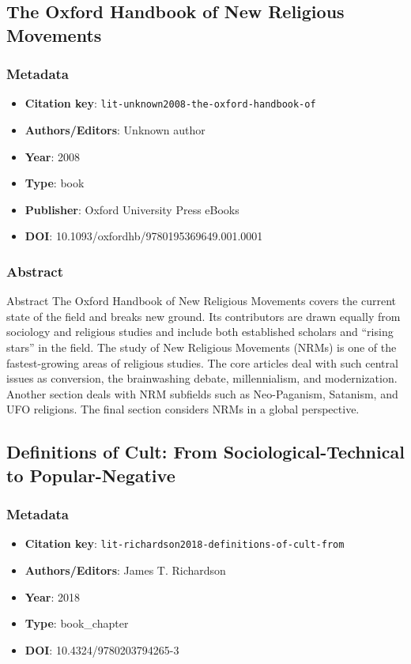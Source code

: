 \subsection{The Oxford Handbook of New Religious Movements}\label{lit:lit-unknown2008-the-oxford-handbook-of}
\subsubsection*{Metadata}
\begin{itemize}
  \item \textbf{Citation key}: \texttt{lit-unknown2008-the-oxford-handbook-of}
  \item \textbf{Authors/Editors}: Unknown author
  \item \textbf{Year}: 2008
  \item \textbf{Type}: book
  \item \textbf{Publisher}: Oxford University Press eBooks
  \item \textbf{DOI}: 10.1093/oxfordhb/9780195369649.001.0001
\end{itemize}
\subsubsection*{Abstract}
Abstract The Oxford Handbook of New Religious Movements covers the current state of the field and breaks new ground. Its contributors are drawn equally from sociology and religious studies and include both established scholars and “rising stars” in the field. The study of New Religious Movements (NRMs) is one of the fastest-growing areas of religious studies. The core articles deal with such central issues as conversion, the brainwashing debate, millennialism, and modernization. Another section deals with NRM subfields such as Neo-Paganism, Satanism, and UFO religions. The final section considers NRMs in a global perspective.

\subsection{Definitions of Cult: From Sociological-Technical to Popular-Negative}\label{lit:lit-richardson2018-definitions-of-cult-from}
\subsubsection*{Metadata}
\begin{itemize}
  \item \textbf{Citation key}: \texttt{lit-richardson2018-definitions-of-cult-from}
  \item \textbf{Authors/Editors}: James T. Richardson
  \item \textbf{Year}: 2018
  \item \textbf{Type}: book\_chapter
  \item \textbf{DOI}: 10.4324/9780203794265-3
\end{itemize}
